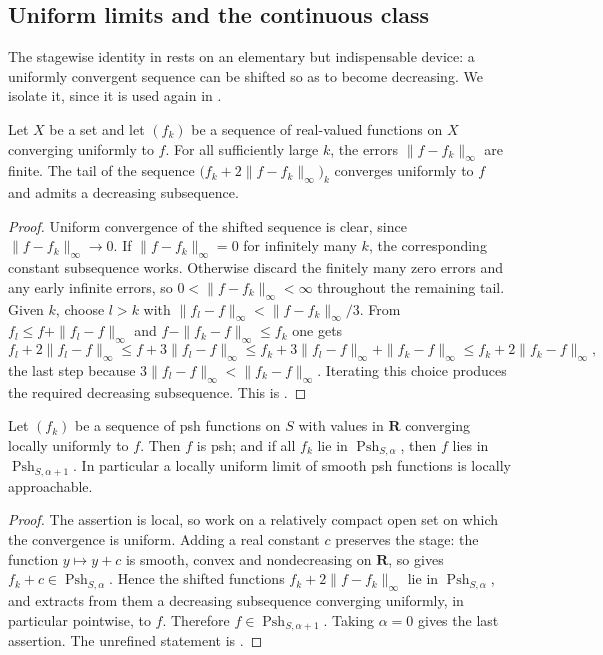 \subsection{Uniform limits and the continuous class}
\label{sec:ch15-uniform}

The stagewise identity in  rests on an elementary
but indispensable device: a uniformly convergent sequence can be shifted so
as to become decreasing.  We isolate it, since it is used again in
.

\begin{lemma}
\label{lem:ch15-shift}
Let $X$ be a set and let $(f_k)$ be a sequence of real-valued functions on
$X$ converging uniformly to $f$.  For all sufficiently large $k$, the errors $\|f-f_k\|_\infty$ are finite.
The tail of the sequence $\bigl(f_k+2\|f-f_k\|_\infty\bigr)_k$
converges uniformly to $f$ and admits a decreasing subsequence.
\end{lemma}

\begin{proof}
Uniform convergence of the shifted sequence is clear, since
$\|f-f_k\|_\infty\to0$.  If $\|f-f_k\|_\infty=0$ for infinitely many $k$, the
corresponding constant subsequence works.  Otherwise discard the finitely many zero errors and any early infinite
errors, so $0<\|f-f_k\|_\infty<\infty$ throughout the remaining tail.  Given $k$, choose $l>k$ with
$\|f_l-f\|_\infty<\|f-f_k\|_\infty/3$.  From $f_l\le f+\|f_l-f\|_\infty$ and
$f-\|f_k-f\|_\infty\le f_k$ one gets
\[
 f_l+2\|f_l-f\|_\infty
 \le f+3\|f_l-f\|_\infty
 \le f_k+3\|f_l-f\|_\infty+\|f_k-f\|_\infty
 \le f_k+2\|f_k-f\|_\infty ,
\]
the last step because $3\|f_l-f\|_\infty<\|f_k-f\|_\infty$.  Iterating this
choice produces the required decreasing subsequence.  This is
\cite[Lemma~8.1.10]{CLD25}.
\end{proof}

\begin{proposition}
\label{prop:ch15-uniform-limit}
Let $(f_k)$ be a sequence of psh functions on $S$ with values in $\mathbf R$
converging locally uniformly to $f$.  Then $f$ is psh; and if all $f_k$ lie
in $\operatorname{Psh}_{S,\alpha}$, then $f$ lies in
$\operatorname{Psh}_{S,\alpha+1}$.  In particular a locally uniform limit of
smooth psh functions is locally approachable.
\end{proposition}

\begin{proof}
The assertion is local, so work on a relatively compact open set on which the
convergence is uniform.  Adding a real constant $c$ preserves the stage: the
function $y\mapsto y+c$ is smooth, convex and nondecreasing on $\mathbf R$,
so  gives
$f_k+c\in\operatorname{Psh}_{S,\alpha}$.  Hence the shifted functions
$f_k+2\|f-f_k\|_\infty$ lie in $\operatorname{Psh}_{S,\alpha}$, and
 extracts from them a decreasing subsequence converging
uniformly, in particular pointwise, to $f$.  Therefore
$f\in\operatorname{Psh}_{S,\alpha+1}$.  Taking $\alpha=0$ gives the last
assertion.  The unrefined statement is
\cite[Proposition~8.1.9]{CLD25}.
\end{proof}

